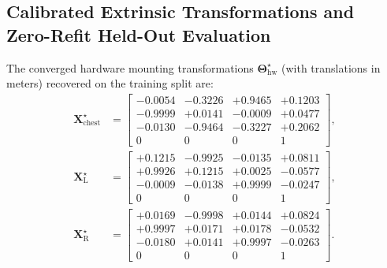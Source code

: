 \documentclass[10pt,journal]{IEEEtran}
\begin{document}
\begin{table}[t]
    \centering
    \caption{Calibrated 3D Metric Coordinates of the Four $30\,\mathrm{mm}$ Tabletop AprilTag Fiducials in $O_{\mathrm{table}}$}
    \label{tab:apriltag_coords}
    \scriptsize
\end{table}

\subsection{Calibrated Extrinsic Transformations and Zero-Refit Held-Out Evaluation}
The converged hardware mounting transformations $\boldsymbol{\Theta}_{\mathrm{hw}}^{\star}$ (with translations in meters) recovered on the training split are:
\begin{align}
    \mathbf{X}_{\mathrm{chest}}^{\star} &= \begin{bmatrix}
        -0.0054 & -0.3226 & +0.9465 & +0.1203 \\
        -0.9999 & +0.0141 & -0.0009 & +0.0477 \\
        -0.0130 & -0.9464 & -0.3227 & +0.2062 \\
        0 & 0 & 0 & 1
    \end{bmatrix}, \label{eq:x_chest} \\
    \mathbf{X}_{\mathrm{L}}^{\star} &= \begin{bmatrix}
        +0.1215 & -0.9925 & -0.0135 & +0.0811 \\
        +0.9926 & +0.1215 & +0.0025 & -0.0577 \\
        -0.0009 & -0.0138 & +0.9999 & -0.0247 \\
        0 & 0 & 0 & 1
    \end{bmatrix}, \label{eq:x_left} \\
    \mathbf{X}_{\mathrm{R}}^{\star} &= \begin{bmatrix}
        +0.0169 & -0.9998 & +0.0144 & +0.0824 \\
        +0.9997 & +0.0171 & +0.0178 & -0.0532 \\
        -0.0180 & +0.0141 & +0.9997 & -0.0263 \\
        0 & 0 & 0 & 1
    \end{bmatrix}. \label{eq:x_right}
\end{align}
\end{document}
